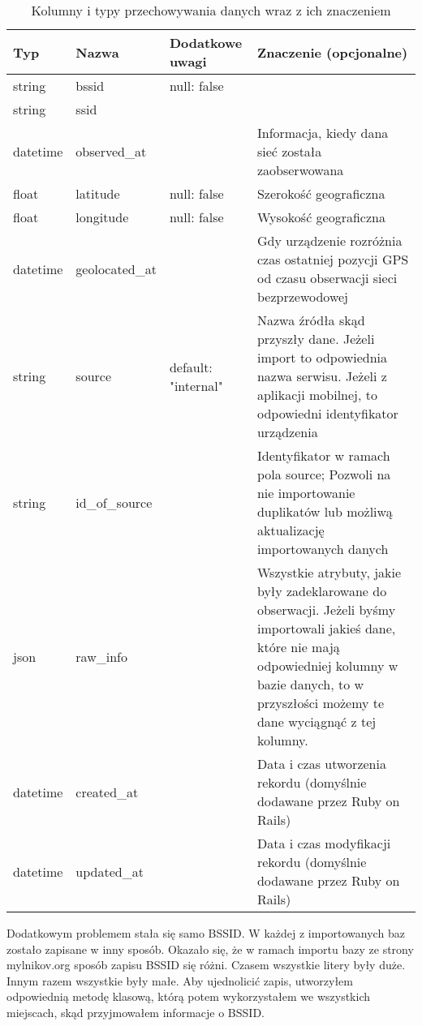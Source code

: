 \begin{table}
\caption{Kolumny i typy przechowywania danych wraz z ich znaczeniem}
\label{table:dbscheme}
\begin{tabular} { |l|l|l|p{6cm}|  }
\hline
Typ & Nazwa & Dodatkowe uwagi & Znaczenie (opcjonalne) \\
\hline
\hline
string   & bssid & null: false & \\
\hline
string   & ssid & & \\
\hline
datetime & observed\_at & & Informacja, kiedy dana sieć została zaobserwowana \\
\hline
float    & latitude & null: false & Szerokość geograficzna \\
\hline
float    & longitude & null: false & Wysokość geograficzna \\
\hline
datetime & geolocated\_at & & Gdy urządzenie rozróżnia czas ostatniej pozycji GPS od czasu obserwacji sieci bezprzewodowej \\
\hline
string   & source & default: "internal" & Nazwa źródła skąd przyszły dane. Jeżeli import to odpowiednia nazwa serwisu. Jeżeli z aplikacji mobilnej, to odpowiedni identyfikator urządzenia \\
\hline
string   & id\_of\_source & & Identyfikator w ramach pola source; Pozwoli na nie importowanie duplikatów lub możliwą aktualizację importowanych danych \\
\hline
json     & raw\_info & & Wszystkie atrybuty, jakie były zadeklarowane do obserwacji. Jeżeli byśmy importowali jakieś dane, które nie mają odpowiedniej kolumny w bazie danych, to w przyszłości możemy te dane wyciągnąć z tej kolumny. \\
\hline
datetime & created\_at & & Data i czas utworzenia rekordu (domyślnie dodawane przez Ruby on Rails) \\
\hline
datetime & updated\_at & & Data i czas modyfikacji rekordu (domyślnie dodawane przez Ruby on Rails) \\
\hline
\end{tabular}
\end{table}

Dodatkowym problemem stała się samo BSSID. W każdej z importowanych baz zostało zapisane w inny sposób. Okazało się, że w ramach importu bazy ze strony mylnikov.org sposób zapisu BSSID się różni. Czasem wszystkie litery były duże. Innym razem wszystkie były małe. Aby ujednolicić zapis, utworzyłem odpowiednią metodę klasową, którą potem wykorzystałem we wszystkich miejscach, skąd przyjmowałem informacje o BSSID.

